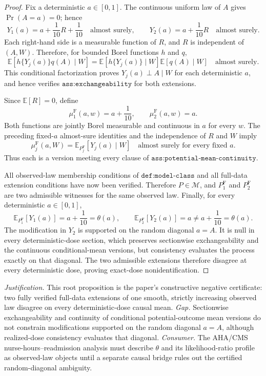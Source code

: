 \documentclass{article}
\begin{document}
\begin{proof}
Fix a deterministic \(a\in[0,1]\).  The continuous uniform law of \(A\) gives \(\Pr(A=a)=0\); hence
\[
 Y_1(a)=a+\frac1{10}R+\frac1{10}\quad\text{almost surely},
 \qquad
 Y_2(a)=a+\frac1{10}R\quad\text{almost surely}.
\]
Each right-hand side is a measurable function of \(R\), and \(R\) is independent of \((A,W)\).  Therefore, for bounded Borel functions \(h\) and \(q\),
\[
 \mathbb E\!\left[h\{Y_j(a)\}q(A)\mid W\right]
 =\mathbb E\!\left[h\{Y_j(a)\}\mid W\right]
  \mathbb E\!\left[q(A)\mid W\right]
 \quad\text{almost surely}.
\]
This conditional factorization proves \(Y_j(a)\perp A\mid W\) for each deterministic \(a\), and hence verifies \(\texttt{ass:exchangeability}\) for both extensions.

Since \(\mathbb E[R]=0\), define
\[
 \mu^{\mathrm F}_1(a,w)=a+\frac1{10},
 \qquad
 \mu^{\mathrm F}_2(a,w)=a.
\]
Both functions are jointly Borel measurable and continuous in \(a\) for every \(w\).  The preceding fixed-\(a\) almost-sure identities and the independence of \(R\) and \(W\) imply
\[
 \mu^{\mathrm F}_j(a,W)
 =\mathbb E_{P_j^{\mathrm F}}[Y_j(a)\mid W]
 \quad\text{almost surely for every fixed }a.
\]
Thus each is a version meeting every clause of \(\texttt{ass:potential-mean-continuity}\).

All observed-law membership conditions of \(\texttt{def:model-class}\) and all full-data extension conditions have now been verified.  Therefore \(P\in\mathcal M\), and \(P_1^{\mathrm F}\) and \(P_2^{\mathrm F}\) are two admissible witnesses for the same observed law.  Finally, for every deterministic \(a\in[0,1]\),
\[
 \mathbb E_{P_1^{\mathrm F}}[Y_1(a)]
 =a+\frac1{10}=\theta(a),
 \qquad
 \mathbb E_{P_2^{\mathrm F}}[Y_2(a)]
 =a\ne a+\frac1{10}=\theta(a).
\]
The modification in \(Y_2\) is supported on the random diagonal \(a=A\).  It is null in every deterministic-dose section, which preserves sectionwise exchangeability and the continuous conditional-mean versions, but consistency evaluates the process exactly on that diagonal.  The two admissible extensions therefore disagree at every deterministic dose, proving exact-dose nonidentification.
\end{proof}
\par\smallskip\noindent \textit{Justification.} This root proposition is the paper's constructive negative certificate: two fully verified full-data extensions of one smooth, strictly increasing observed law disagree on every deterministic-dose causal mean. \textit{Gap.} Sectionwise exchangeability and continuity of conditional potential-outcome mean versions do not constrain modifications supported on the random diagonal \(a=A\), although realized-dose consistency evaluates that diagonal. \textit{Consumer.} The AHA/CMS nurse-hours--readmission analysis must describe \(\theta\) and its likelihood-ratio profile as observed-law objects until a separate causal bridge rules out the certified random-diagonal ambiguity.
\end{document}
